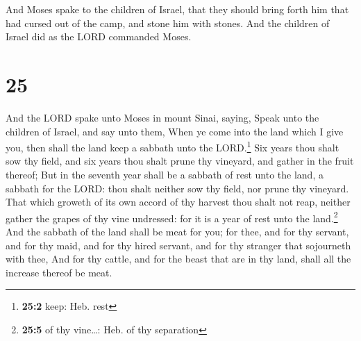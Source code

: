  And Moses spake to the children of Israel, that they
should bring forth him that had cursed out of the camp, and stone him
with stones. And the children of Israel did as the LORD commanded Moses.

\hypertarget{section-24}{%
\section{25}\label{section-24}}

 And the LORD spake unto Moses in mount Sinai, saying,
 Speak unto the children of Israel, and say unto them,
When ye come into the land which I give you, then shall the land keep a
sabbath unto the LORD.\footnote{\textbf{25:2} keep: Heb. rest}
 Six years thou shalt sow thy field, and six years thou
shalt prune thy vineyard, and gather in the fruit thereof;
 But in the seventh year shall be a sabbath of rest unto
the land, a sabbath for the LORD: thou shalt neither sow thy field, nor
prune thy vineyard.  That which groweth of its own accord
of thy harvest thou shalt not reap, neither gather the grapes of thy
vine undressed: for it is a year of rest unto the land.\footnote{\textbf{25:5}
  of thy vine\ldots: Heb. of thy separation}  And the
sabbath of the land shall be meat for you; for thee, and for thy
servant, and for thy maid, and for thy hired servant, and for thy
stranger that sojourneth with thee,  And for thy cattle,
and for the beast that are in thy land, shall all the increase thereof
be meat.

